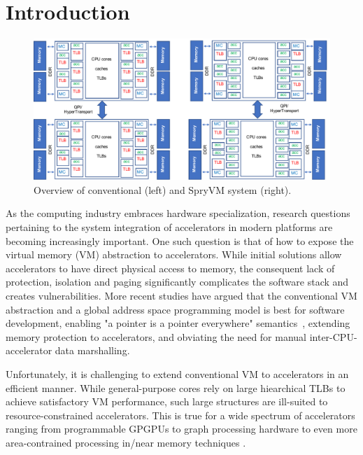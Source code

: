 \section{Introduction}
\label{sec:intro}

\begin{figure}
\centering
 \includegraphics[width=1\textwidth,clip]{graphs/overview.pdf}
 \caption{Overview of conventional (left) and SpryVM system (right).}
\label{fig:overview}
\end{figure}

As the computing industry embraces hardware specialization, research
questions pertaining to the system integration of accelerators in
modern platforms are becoming increasingly important. One such
question is that of how to expose the virtual memory (VM) abstraction
to accelerators. While initial solutions allow accelerators to have
direct physical access to memory, the consequent lack of protection,
isolation and paging significantly complicates the software
stack and creates vulnerabilities. More recent studies have argued that the conventional VM
abstraction and a global address space programming model is best for
software development, enabling "a pointer is a pointer everywhere"
semantics~\cite{pichai:architectural, power:supporting,
  haria:devirtualizing, vesely:observation, ausavarungnirun:mosaic},
extending memory protection to accelerators, and obviating the need
for manual inter-CPU-accelerator data marshalling.

Unfortunately, it is challenging to extend conventional VM to
accelerators in an efficient manner. While general-purpose cores rely
on large hiearchical TLBs to achieve satisfactory VM performance, such
large structures are ill-suited to resource-constrained
accelerators. This is true for a wide spectrum of accelerators ranging
from programmable GPGPUs \cite{pichai:architectural, power:supporting}
to graph processing hardware \cite{haria:devirtualizing} to even more
area-contrained processing in/near memory techniques
\cite{picorel:near-memory}.

